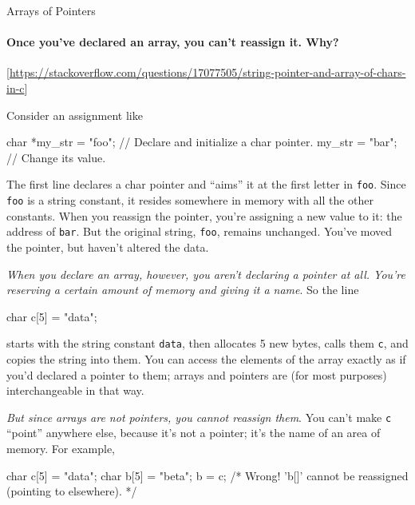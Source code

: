 \begin{frame}[fragile]{Arrays of Pointers}
  \begin{center}
  \end{center}
\end{frame}

\paragraph*{Once you've declared an array, you can't reassign it. Why?}
[\url{https://stackoverflow.com/questions/17077505/string-pointer-and-array-of-chars-in-c}]

Consider an assignment like

\begin{ccode}
char *my_str = "foo"; // Declare and initialize a char pointer.
my_str = "bar"; // Change its value.
\end{ccode}

The first line declares a char pointer and ``aims'' it at the first letter in \texttt{foo}. Since \texttt{foo} is a string constant, it resides somewhere in memory with all the other constants. When you reassign the pointer, you're assigning a new value to it: the address of \texttt{bar}. But the original string, \texttt{foo}, remains unchanged. You've moved the pointer, but haven't altered the data.

\emph{When you declare an array, however, you aren't declaring a pointer at all. You're reserving a certain amount of memory and giving it a name}. So the line

\begin{ccode}
char c[5] = "data";
\end{ccode}

starts with the string constant \texttt{data}, then allocates 5 new bytes, calls them \texttt{c}, and copies the string into them. You can access the elements of the array exactly as if you'd declared a pointer to them; arrays and pointers are (for most purposes) interchangeable in that way.

\emph{But since arrays are not pointers, you cannot reassign them}. You can't make
\texttt{c} ``point'' anywhere else, because it's not a pointer; it's the name of an area of
memory. For example,

\begin{ccode}
char c[5] = "data";
char b[5] = "beta";
b = c; /* Wrong! 'b[]' cannot be reassigned (pointing to elsewhere). */
\end{ccode}


